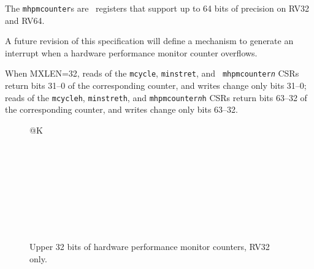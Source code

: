 The {\tt mhpmcounter}s are \warl\ registers that support up to 64 bits of
precision on RV32 and RV64.

\begin{commentary}
A future revision of this specification will define a mechanism to generate an
interrupt when a hardware performance monitor counter overflows.
\end{commentary}

When MXLEN=32, reads of the {\tt mcycle}, {\tt minstret}, and {\tt
mhpmcounter{\em n}} CSRs return bits 31--0 of the corresponding counter, and
writes change only bits 31--0; reads of the {\tt mcycleh}, {\tt minstreth},
and {\tt mhpmcounter{\em n}h} CSRs return bits 63--32 of the corresponding
counter, and writes change only bits 63--32.

\begin{figure}[h!]
{\footnotesize
\begin{center}
\begin{tabular}{@{}K}
 \\ \hline
{} \\ \hline
{} \\ \hline
{} \\ \hline
{} \\ \hline
{}  \\ \hline
{} \\ \hline
{} \\  \\
\end{tabular}
\end{center}
}
\vspace{-0.1in}
\caption{Upper 32 bits of hardware performance monitor counters, RV32 only.}
\end{figure}


